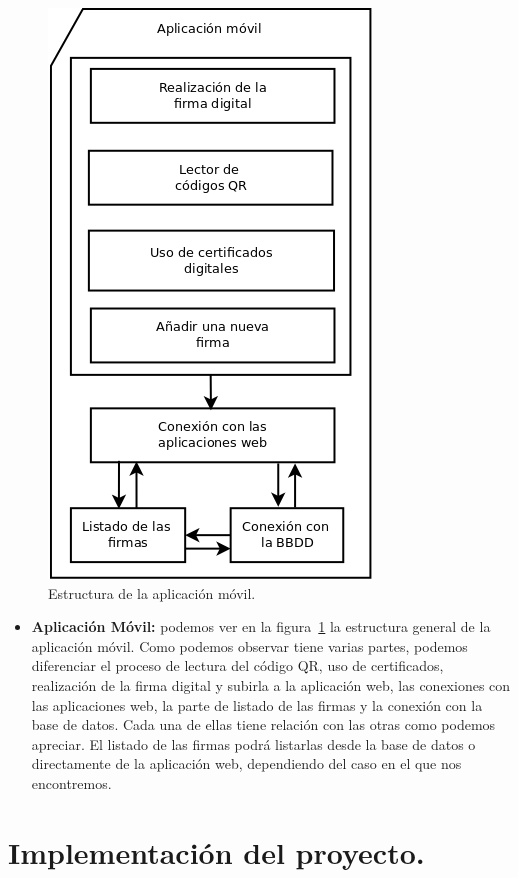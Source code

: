 \begin{figure}
  \centering
    \includegraphics[scale=0.3]{./DisenhoYArquitectura/imagenes/aplicacionMovil.png}
  \caption{Estructura de la aplicación móvil.}
  \label{fig:aplicacionMovil}
\end{figure}

\begin{itemize}
\item \textbf{Aplicación Móvil:} podemos ver en la figura~\ref{fig:aplicacionMovil} la estructura general de la aplicación móvil. Como podemos observar tiene varias partes, podemos diferenciar el proceso de lectura del código QR, uso de certificados, realización de la firma digital y subirla a la aplicación web, las conexiones con las aplicaciones web, la parte de listado de las firmas y la conexión con la base de datos. Cada una de ellas tiene relación con las otras como podemos apreciar. El listado de las firmas podrá listarlas desde la base de datos o directamente de la aplicación web, dependiendo del caso en el que nos encontremos.
\end{itemize}

\section{Implementación del proyecto.}

